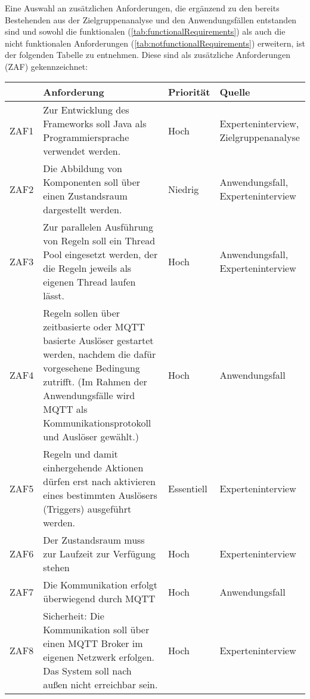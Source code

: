 \subsubsection*{}
Eine Auswahl an zusätzlichen Anforderungen, die ergänzend zu den bereits Bestehenden aus der Zielgruppenanalyse und den Anwendungsfällen entstanden sind und sowohl die funktionalen 
(\ref{tab:functionalRequirements}) als auch die nicht funktionalen Anforderungen (\ref{tab:notfunctionalRequirements}) erweitern, ist der folgenden 
Tabelle zu entnehmen. Diese sind als zusätzliche Anforderungen (ZAF) gekennzeichnet: 
\begin{table}[hbt!]
    \begin{center}
        \begin{tabular}{ | p{1.0cm} | p{9.2cm} | p{1.6cm} | p{3.1cm} | }
            \hline
                \textbf{} & \textbf{Anforderung} & \textbf{Priorität} & \textbf{Quelle} \\
            \hline
                ZAF1 & Zur Entwicklung des Frameworks soll Java als Programmiersprache verwendet werden. & Hoch & Experteninterview, Zielgruppenanalyse \\ 
            \hline
                ZAF2 & Die Abbildung von Komponenten soll über einen Zustandsraum dargestellt werden. & Niedrig & Anwendungsfall, Experteninterview \\ 
            \hline
                ZAF3 & Zur parallelen Ausführung von Regeln soll ein Thread Pool eingesetzt werden, der die Regeln jeweils als eigenen Thread laufen lässt. & Hoch & Anwendungsfall, Experteninterview \\ 
            \hline
                ZAF4 & Regeln sollen über zeitbasierte oder MQTT basierte Auslöser gestartet werden, nachdem die dafür vorgesehene Bedingung zutrifft. (Im Rahmen der Anwendungsfälle wird MQTT als Kommunikationsprotokoll und Auslöser gewählt.) & Hoch & Anwendungsfall \\
            \hline
                ZAF5 & Regeln und damit einhergehende Aktionen dürfen erst nach aktivieren eines bestimmten Auslösers (Triggers) ausgeführt werden. & Essentiell & Experteninterview \\
            \hline
                ZAF6 & Der Zustandsraum muss zur Laufzeit zur Verfügung stehen & Hoch & Experteninterview \\ 
            \hline
                ZAF7 & Die Kommunikation erfolgt überwiegend durch MQTT & Hoch & Anwendungsfall \\ 
            \hline
                ZAF8 & Sicherheit: Die Kommunikation soll über einen MQTT Broker im eigenen Netzwerk erfolgen. Das System soll nach außen nicht erreichbar sein. & Hoch & Experteninterview \\

\end{tabular}
\end{center}
\end{table}
